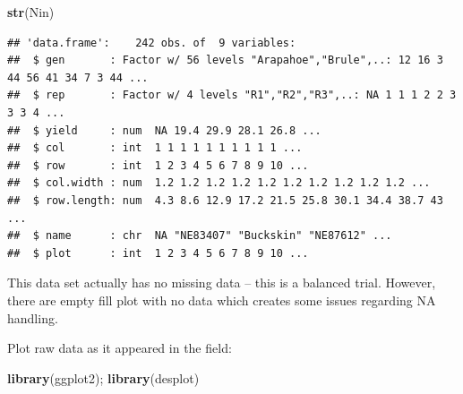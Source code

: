 \documentclass[]{book}
\newenvironment{Shaded}{\begin{snugshade}}{\end{snugshade}}
\newcommand{\KeywordTok}[1]{\textcolor[rgb]{0.13,0.29,0.53}{\textbf{#1}}}
\newcommand{\NormalTok}[1]{#1}
\begin{document}
\begin{Shaded}
\begin{Highlighting}[]
\KeywordTok{str}\NormalTok{(Nin)}
\end{Highlighting}
\end{Shaded}

\begin{verbatim}
## 'data.frame':    242 obs. of  9 variables:
##  $ gen       : Factor w/ 56 levels "Arapahoe","Brule",..: 12 16 3 44 56 41 34 7 3 44 ...
##  $ rep       : Factor w/ 4 levels "R1","R2","R3",..: NA 1 1 1 2 2 3 3 3 4 ...
##  $ yield     : num  NA 19.4 29.9 28.1 26.8 ...
##  $ col       : int  1 1 1 1 1 1 1 1 1 1 ...
##  $ row       : int  1 2 3 4 5 6 7 8 9 10 ...
##  $ col.width : num  1.2 1.2 1.2 1.2 1.2 1.2 1.2 1.2 1.2 1.2 ...
##  $ row.length: num  4.3 8.6 12.9 17.2 21.5 25.8 30.1 34.4 38.7 43 ...
##  $ name      : chr  NA "NE83407" "Buckskin" "NE87612" ...
##  $ plot      : int  1 2 3 4 5 6 7 8 9 10 ...
\end{verbatim}

This data set actually has no missing data -- this is a balanced trial. However, there are empty fill plot with no data which creates some issues regarding NA handling.

Plot raw data as it appeared in the field:

\begin{Shaded}
\begin{Highlighting}[]
\KeywordTok{library}\NormalTok{(ggplot2); }\KeywordTok{library}\NormalTok{(desplot)}
\end{Highlighting}
\end{Shaded}
\end{document}
